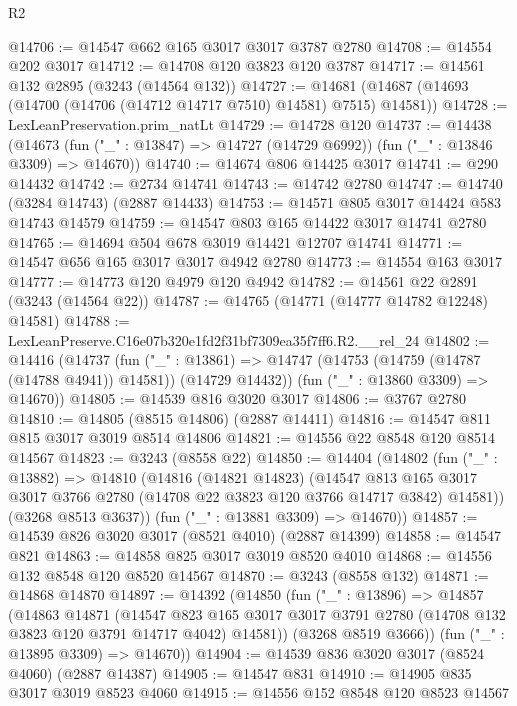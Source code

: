 \begin{lexlean}{R2}
\begin{coremodule}
@14706 := @14547 @662 @165 @3017 @3017 @3787 @2780
@14708 := @14554 @202 @3017
@14712 := @14708 @120 @3823 @120 @3787
@14717 := @14561 @132 @2895 (@3243 (@14564 @132))
@14727 := @14681 (@14687 (@14693 (@14700 (@14706 (@14712 @14717 @7510) @14581) @7515) @14581))
@14728 := LexLeanPreservation.prim_natLt
@14729 := @14728 @120
@14737 := @14438
    (@14673 (fun ("_" : @13847) => @14727 (@14729 @6992)) (fun ("_" : @13846 @3309) => @14670))
@14740 := @14674 @806 @14425 @3017
@14741 := @290 @14432
@14742 := @2734 @14741
@14743 := @14742 @2780
@14747 := @14740 (@3284 @14743) (@2887 @14433)
@14753 := @14571 @805 @3017 @14424 @583 @14743 @14579
@14759 := @14547 @803 @165 @14422 @3017 @14741 @2780
@14765 := @14694 @504 @678 @3019 @14421 @12707 @14741
@14771 := @14547 @656 @165 @3017 @3017 @4942 @2780
@14773 := @14554 @163 @3017
@14777 := @14773 @120 @4979 @120 @4942
@14782 := @14561 @22 @2891 (@3243 (@14564 @22))
@14787 := @14765 (@14771 (@14777 @14782 @12248) @14581)
@14788 := LexLeanPreserve.C16e07b320e1fd2f31bf7309ea35f7ff6.R2.__rel_24
@14802 := @14416
    (@14737
      (fun ("_" : @13861) =>
      @14747 (@14753 (@14759 (@14787 (@14788 @4941)) @14581)) (@14729 @14432))
      (fun ("_" : @13860 @3309) => @14670))
@14805 := @14539 @816 @3020 @3017
@14806 := @3767 @2780
@14810 := @14805 (@8515 @14806) (@2887 @14411)
@14816 := @14547 @811 @815 @3017 @3019 @8514 @14806
@14821 := @14556 @22 @8548 @120 @8514 @14567
@14823 := @3243 (@8558 @22)
@14850 := @14404
    (@14802
      (fun ("_" : @13882) =>
      @14810
        (@14816
          (@14821 @14823)
          (@14547
            @813
            @165
            @3017
            @3017
            @3766
            @2780
            (@14708 @22 @3823 @120 @3766 @14717 @3842)
            @14581))
        (@3268 @8513 @3637))
      (fun ("_" : @13881 @3309) => @14670))
@14857 := @14539 @826 @3020 @3017 (@8521 @4010) (@2887 @14399)
@14858 := @14547 @821
@14863 := @14858 @825 @3017 @3019 @8520 @4010
@14868 := @14556 @132 @8548 @120 @8520 @14567
@14870 := @3243 (@8558 @132)
@14871 := @14868 @14870
@14897 := @14392
    (@14850
      (fun ("_" : @13896) =>
      @14857
        (@14863
          @14871
          (@14547
            @823
            @165
            @3017
            @3017
            @3791
            @2780
            (@14708 @132 @3823 @120 @3791 @14717 @4042)
            @14581))
        (@3268 @8519 @3666))
      (fun ("_" : @13895 @3309) => @14670))
@14904 := @14539 @836 @3020 @3017 (@8524 @4060) (@2887 @14387)
@14905 := @14547 @831
@14910 := @14905 @835 @3017 @3019 @8523 @4060
@14915 := @14556 @152 @8548 @120 @8523 @14567

\end{coremodule}
\end{lexlean}
